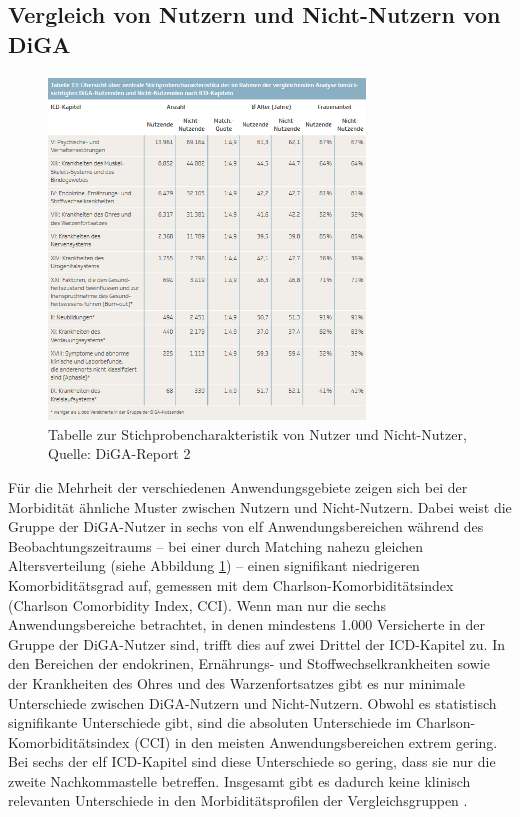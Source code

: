 \documentclass{article}
\begin{document}
		\subsection{Vergleich von Nutzern und Nicht-Nutzern von DiGA}
			\begin{figure}[htbp]
				\centering
				\includegraphics[width=0.75\textwidth]{./grafiken/tabelle_vergleich_nutzer_nicht_nutzer_diga}
				\caption[Stichprobencharakteristik von Nutzer und Nicht-Nutzer]{Tabelle zur Stichprobencharakteristik von Nutzer und Nicht-Nutzer, Quelle: DiGA-Report 2 \cite{TK-Report-2}}
				\label{Tab-stichprobe-diga}
			\end{figure}
			Für die Mehrheit der verschiedenen Anwendungsgebiete zeigen sich bei der Morbidität ähnliche Muster zwischen Nutzern und Nicht-Nutzern. Dabei weist die Gruppe der DiGA-Nutzer in sechs von elf Anwendungsbereichen während des Beobachtungszeitraums – bei einer durch Matching nahezu gleichen Altersverteilung (siehe Abbildung \ref{Tab-stichprobe-diga}) – einen signifikant niedrigeren Komorbiditätsgrad auf, gemessen mit dem Charlson-Komorbiditätsindex (Charlson Comorbidity Index, CCI). Wenn man nur die sechs Anwendungsbereiche betrachtet, in denen mindestens 1.000 Versicherte in der Gruppe der DiGA-Nutzer sind, trifft dies auf zwei Drittel der ICD-Kapitel zu. In den Bereichen der endokrinen, Ernährungs- und Stoffwechselkrankheiten sowie der Krankheiten des Ohres und des Warzenfortsatzes gibt es nur minimale Unterschiede zwischen DiGA-Nutzern und Nicht-Nutzern. Obwohl es statistisch signifikante Unterschiede gibt, sind die absoluten Unterschiede im Charlson-Komorbiditätsindex (CCI) in den meisten Anwendungsbereichen extrem gering. Bei sechs der elf ICD-Kapitel sind diese Unterschiede so gering, dass sie nur die zweite Nachkommastelle betreffen. Insgesamt gibt es dadurch keine klinisch relevanten Unterschiede in den Morbiditätsprofilen der Vergleichsgruppen \cite[vgl. S. 36]{TK-Report-2}.
			
\end{document}
